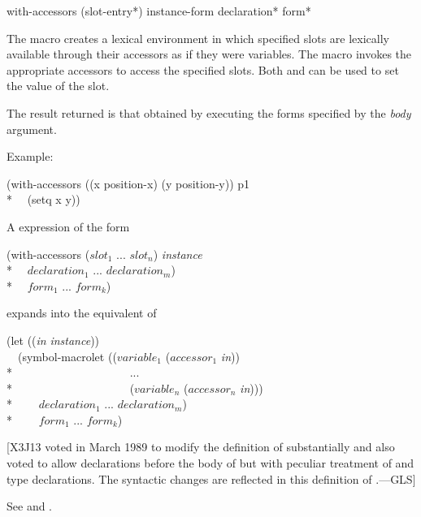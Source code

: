 \begin{defmac}
with-accessors ({slot-entry}*) instance-form
     {declaration}* {form}*

The macro  creates a lexical environment in which
specified slots are lexically available through their accessors as if
they were variables.  The macro  invokes the
appropriate accessors to access the specified slots.  Both 
and  can be used to set the value of the slot.

 

The result returned is that obtained by executing the forms specified
by the \emph{body\/} argument.

Example:

\begin{lisp}
(with-accessors ((x position-x) (y position-y)) p1 \\*
~~(setq x y))
\end{lisp}


A  expression of the form
\begin{lisp}
(with-accessors (\textrm{$slot_1$} ... \textrm{$slot_{n}$}) \emph{instance\/} \\*
~~$declaration_1$ ... $declaration_{m}$) \\*
~~$form_1$ ... $form_{k}$)
\end{lisp}
expands into the equivalent of
\begin{lisp}
(let ((\emph{in\/} \emph{instance\/})) \\
~~(symbol-macrolet ((\textrm{$variable_1$} (\textrm{$accessor_1$} \emph{in\/})) \\*
~~~~~~~~~~~~~~~~~~~~... \\*
~~~~~~~~~~~~~~~~~~~~(\textrm{$variable_{n}$} (\textrm{$accessor_{n}$} \emph{in\/}))) \\*
~~~~$declaration_1$ ... $declaration_{m}$) \\*
~~~~$form_1$ ... $form_{k}$)
\end{lisp}

[X3J13 voted in March 1989
to modify the definition of  substantially
and also voted
 to allow declarations before the body
of  but with peculiar treatment of 
and type declarations.  The syntactic changes are reflected in this definition
of .---GLS]

See  and .
\end{defmac}


